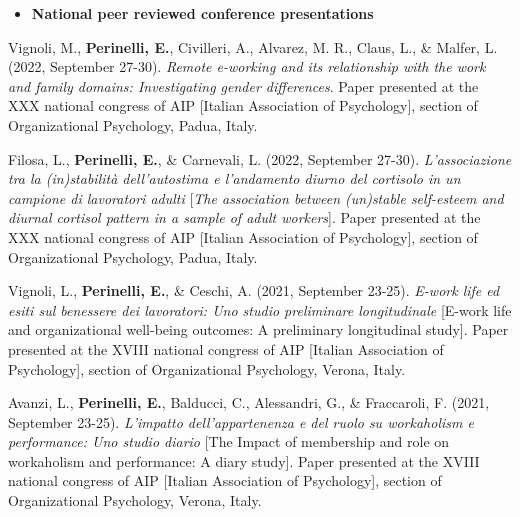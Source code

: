 \documentclass[hidelinks, letterpaper,10pt]{article} %
\begin{document}
\vspace{3mm}

\begin{itemize} 
	\setlength{\topsep}{0pt}%
	\setlength{\leftmargin}{0.1in}%
	\setlength{\listparindent}{-0.1in}%
	\setlength{\itemindent}{-0.2in}%
	\setlength{\parsep}{\parskip}%
	
	\item {\textbf{\large{National peer reviewed conference presentations}}}
\end{itemize}
\begin{etaremune}
	
	\item Vignoli, M., \textbf{Perinelli, E.}, Civilleri, A., Alvarez, M. R., Claus, L., \& Malfer, L. (2022, September 27-30). \textit{Remote e-working and its relationship with the work and family domains: Investigating gender differences}. Paper presented at the XXX national congress of AIP [Italian Association of Psychology], section of Organizational Psychology, Padua, Italy.

	\item Filosa, L., \textbf{Perinelli, E.}, \& Carnevali, L. (2022, September 27-30). \textit{L'associazione tra la (in)stabilità dell'autostima e l'andamento diurno del cortisolo in un campione di lavoratori adulti} [\textit{The association between (un)stable self-esteem and diurnal cortisol pattern in a sample of adult workers}]. Paper presented at the XXX national congress of AIP [Italian Association of Psychology], section of Organizational Psychology, Padua, Italy.
	
	\item Vignoli, L., \textbf{Perinelli, E.}, \& Ceschi, A. (2021, September 23-25). \textit{E-work life ed esiti sul benessere dei lavoratori: Uno studio preliminare longitudinale} [E-work life and organizational well-being outcomes: A preliminary longitudinal study]. Paper presented at the XVIII national congress of AIP [Italian Association of Psychology], section of Organizational Psychology, Verona, Italy.

    \item Avanzi, L., \textbf{Perinelli, E.}, Balducci, C., Alessandri, G., \& Fraccaroli, F. (2021, September 23-25). \textit{L’impatto dell'appartenenza e del ruolo su workaholism e performance: Uno studio diario} [The Impact of membership and role on workaholism and performance: A diary study]. Paper presented at the XVIII national congress of AIP [Italian Association of Psychology], section of Organizational Psychology, Verona, Italy.


\end{etaremune}
\end{document}
